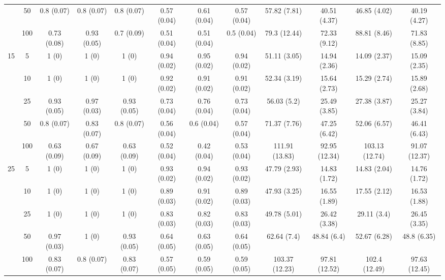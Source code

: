 \documentclass[11pt,3p,review,authoryear]{elsarticle}
\theoremstyle{definition}
\begin{document}
\begin{landscape}
\begin{table}[b]
\begin{center}
{\begin{tabular}{cc|ccc|ccc|cccc|}
    & 50  & 0.8 (0.07) & 0.8 (0.07) & 0.8 (0.07) & 0.57 (0.04) & 0.61 (0.04) & 0.57 (0.04) & 57.82 (7.81) & 40.51 (4.37) & 46.85 (4.02) & 40.19 (4.27) \\ 
    & 100  & 0.73 (0.08) & 0.93 (0.05) & 0.7 (0.09) & 0.51 (0.04) & 0.51 (0.04) & 0.5 (0.04) & 79.3 (12.44) & 72.33 (9.12) & 88.81 (8.46) & 71.83 (8.85) \\[.3cm] 
   \multirow{5}{*}{15} & 5  & 1 (0) & 1 (0) & 1 (0) & 0.94 (0.02) & 0.95 (0.02) & 0.94 (0.02) & 51.11 (3.05) & 14.94 (2.36) & 14.09 (2.37) & 15.09 (2.35) \\ 
    & 10  & 1 (0) & 1 (0) & 1 (0) & 0.92 (0.02) & 0.91 (0.02) & 0.91 (0.02) & 52.34 (3.19) & 15.64 (2.73) & 15.29 (2.74) & 15.89 (2.68) \\ 
    & 25  & 0.93 (0.05) & 0.97 (0.03) & 0.93 (0.05) & 0.73 (0.04) & 0.76 (0.04) & 0.73 (0.04) & 56.03 (5.2) & 25.49 (3.85) & 27.38 (3.87) & 25.27 (3.84) \\ 
    & 50  & 0.8 (0.07) & 0.83 (0.07) & 0.8 (0.07) & 0.56 (0.04) & 0.6 (0.04) & 0.57 (0.04) & 71.37 (7.76) & 47.25 (6.42) & 52.06 (6.57) & 46.41 (6.43) \\ 
    & 100  & 0.63 (0.09) & 0.67 (0.09) & 0.63 (0.09) & 0.52 (0.04) & 0.42 (0.04) & 0.53 (0.04) & 111.91 (13.83) & 92.95 (12.34) & 103.13 (12.74) & 91.07 (12.37) \\[.3cm] 
   \multirow{5}{*}{25} & 5  & 1 (0) & 1 (0) & 1 (0) & 0.93 (0.02) & 0.94 (0.02) & 0.93 (0.02) & 47.79 (2.93) & 14.83 (1.72) & 14.83 (2.04) & 14.76 (1.72) \\ 
    & 10  & 1 (0) & 1 (0) & 1 (0) & 0.89 (0.03) & 0.91 (0.02) & 0.89 (0.03) & 47.93 (3.25) & 16.55 (1.89) & 17.55 (2.12) & 16.53 (1.88) \\ 
    & 25  & 1 (0) & 1 (0) & 1 (0) & 0.83 (0.03) & 0.82 (0.03) & 0.83 (0.03) & 49.78 (5.01) & 26.42 (3.38) & 29.11 (3.4) & 26.45 (3.35) \\ 
    & 50  & 0.97 (0.03) & 1 (0) & 0.93 (0.05) & 0.64 (0.05) & 0.63 (0.05) & 0.64 (0.05) & 62.64 (7.4) & 48.84 (6.4) & 52.67 (6.28) & 48.8 (6.35) \\ 
    & 100  & 0.83 (0.07) & 0.8 (0.07) & 0.83 (0.07) & 0.57 (0.05) & 0.59 (0.05) & 0.59 (0.05) & 103.37 (12.23) & 97.81 (12.52) & 102.4 (12.49) & 97.63 (12.45) \\
\end{tabular}}
   \end{center}
\end{table}
\end{landscape}
\end{document}
